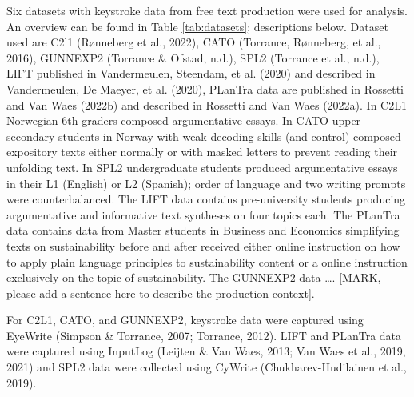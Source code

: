 \documentclass[
  man,floatsintext]{apa7}
\begin{document}
Six datasets with keystroke data from free text production were used for analysis. An overview can be found in Table \ref{tab:datasets}; descriptions below. Dataset used are C2l1 (Rønneberg et al., 2022), CATO (Torrance, Rønneberg, et al., 2016), GUNNEXP2 (Torrance \& Ofstad, n.d.), SPL2 (Torrance et al., n.d.), LIFT published in Vandermeulen, Steendam, et al. (2020) and described in Vandermeulen, De Maeyer, et al. (2020), PLanTra data are published in Rossetti and Van Waes (2022b) and described in Rossetti and Van Waes (2022a). In C2L1 Norwegian 6th graders composed argumentative essays. In CATO upper secondary students in Norway with weak decoding skills (and control) composed expository texts either normally or with masked letters to prevent reading their unfolding text. In SPL2 undergraduate students produced argumentative essays in their L1 (English) or L2 (Spanish); order of language and two writing prompts were counterbalanced. The LIFT data contains pre-university students producing argumentative and informative text syntheses on four topics each. The PLanTra data contains data from Master students in Business and Economics simplifying texts on sustainability before and after received either online instruction on how to apply plain language principles to sustainability content or a online instruction exclusively on the topic of sustainability. The GUNNEXP2 data \ldots. {[}MARK, please add a sentence here to describe the production context{]}.

For C2L1, CATO, and GUNNEXP2, keystroke data were captured using EyeWrite (Simpson \& Torrance, 2007; Torrance, 2012). LIFT and PLanTra data were captured using InputLog (Leijten \& Van Waes, 2013; Van Waes et al., 2019, 2021) and SPL2 data were collected using CyWrite (Chukharev-Hudilainen et al., 2019).
\end{document}
